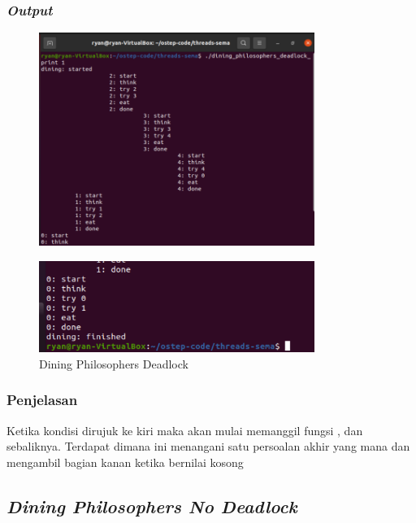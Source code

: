 \documentclass[11pt,a4paper]{article}
\begin{document}
\subsubsection{\textit{Output}}
   \begin{figure}[h]
	\centering
	\includegraphics[width=0.8\textwidth]{Figure/dining_deadlock_print(1).png}
    \end{figure}
       \begin{figure}[h]
	\centering
	\includegraphics[width=0.8\textwidth]{Figure/dining_deadlock_print(2).png}
	\caption{Dining Philosophers Deadlock}
    \end{figure}

\subsubsection{Penjelasan}
 Ketika kondisi  dirujuk ke  kiri maka akan mulai memanggil fungsi , dan sebaliknya. Terdapat  dimana   ini menangani satu persoalan  akhir yang mana  dan  mengambil  bagian kanan ketika  bernilai kosong 
 
\subsection{\textit{Dining Philosophers No Deadlock}}
\end{document}
